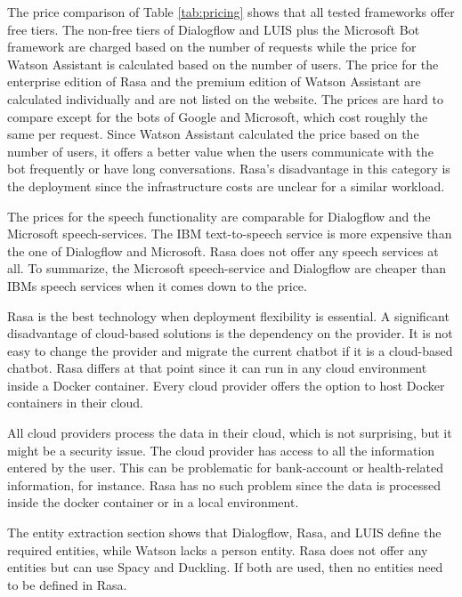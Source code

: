 The price comparison of Table \ref{tab:pricing} shows that all 
tested frameworks offer free tiers.
The non-free tiers of Dialogflow and LUIS plus the Microsoft Bot framework are charged based on the number of requests while the price for Watson Assistant is calculated based on the number of users.
The price for the enterprise edition of Rasa and the premium edition of Watson Assistant are calculated individually and are not listed on the website.
The prices are hard to compare except for the bots of Google and Microsoft, which cost roughly the same per request. 
Since Watson Assistant calculated the price based on the number of users, it offers a better value when the users communicate with the bot frequently or have long conversations.
Rasa's disadvantage in this category is the deployment since the infrastructure costs are unclear for a similar workload.

The prices for the speech functionality are comparable for Dialogflow and the Microsoft speech-services.
The IBM text-to-speech service is more expensive than the one of Dialogflow and Microsoft.
Rasa does not offer any speech services at all.
To summarize, the Microsoft speech-service and Dialogflow are cheaper than IBMs speech services when it comes down to the price. 

Rasa is the best technology when deployment flexibility is essential.
A significant disadvantage of cloud-based solutions is the dependency on the provider.
It is not easy to change the provider and migrate the current chatbot if it is a cloud-based chatbot. 
Rasa differs at that point since it can run in any cloud environment inside a Docker container.
Every cloud provider offers the option to host Docker containers in their cloud.

All cloud providers process the data in their cloud, which is not surprising, but it might be a security issue.
The cloud provider has access to all the information entered by the user.
This can be problematic for bank-account or health-related information, for instance.
Rasa has no such problem since the data is processed inside the docker container or in a local environment.

The entity extraction section shows that Dialogflow, Rasa, and LUIS 
define the required entities, while Watson lacks a person entity.
Rasa does not offer any entities but can use Spacy and Duckling.
If both are used, then no entities need to be defined in Rasa.

